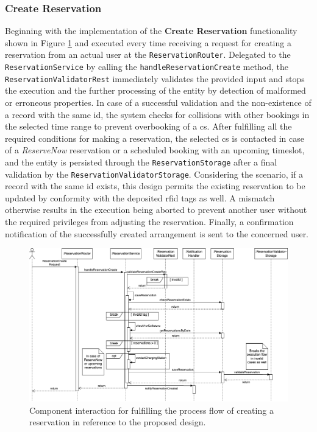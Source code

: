 \subsubsection{Create Reservation}
\label{ch:Implementation:sec:Reservation System:ssec:Management Capabilities:sssec:Create Reservation}

Beginning with the implementation of the \textbf{Create Reservation} functionality shown in Figure \ref{fig:create-reservation-seqflow} and executed every time receiving a request for creating a reservation from an actual user at the \texttt{ReservationRouter}. 
Delegated to the \texttt{ReservationService} by calling the \texttt{handleReservationCreate} method, the \texttt{ReservationValidatorRest} immediately validates the provided input and stops the execution and the further processing of the entity by detection of malformed or erroneous properties.
In case of a successful validation and the non-existence of a record with the same \acrshort{id}, the system checks for collisions with other bookings in the selected time range to prevent overbooking of a \acrshort{cs}.
After fulfilling all the required conditions for making a reservation, the selected \acrshort{cs} is contacted in case of a \textit{ReserveNow} reservation or a scheduled booking with an upcoming timeslot, and the entity is persisted through the \texttt{ReservationStorage} after a final validation by the \texttt{ReservationValidatorStorage}.
Considering the scenario, if a record with the same \acrshort{id} exists, this design permits the existing reservation to be updated by conformity with the deposited \acrshort{rfid} tags as well. A mismatch otherwise results in the execution being aborted to prevent another user without the required privileges from adjusting the reservation.
Finally, a confirmation notification of the successfully created arrangement is sent to the concerned user.

\begin{figure}[h]
    \centering
    \includegraphics[scale=0.4]{resources/images/main/6_implementation/processes/ReservationCreate.png}
    \caption{Component interaction for fulfilling the process flow of creating a reservation in reference to the proposed design.}
    \label{fig:create-reservation-seqflow}
\end{figure}


